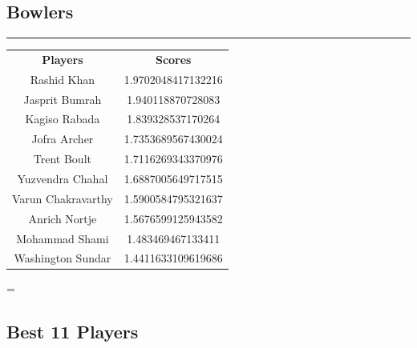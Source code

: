 \documentclass[12pt]{article}
\begin{document}
\begin{minipage}{240pt}
	\subsection*{Bowlers}
	\hrule
	\begin{tabular}{c | c}
		\textbf{Players} & \textbf{Scores}\\
		Rashid Khan & 1.9702048417132216 \\
		Jasprit Bumrah & 1.940118870728083 \\
		Kagiso Rabada & 1.839328537170264 \\
		Jofra Archer & 1.7353689567430024 \\
		Trent Boult & 1.7116269343370976 \\
		Yuzvendra Chahal & 1.6887005649717515 \\
		Varun Chakravarthy & 1.5900584795321637 \\
		Anrich Nortje & 1.5676599125943582 \\
		Mohammad Shami & 1.483469467133411 \\
		Washington Sundar & 1.4411633109619686 \\
	\end{tabular}=\\
\end{minipage}


\subsection*{Best 11 Players}
\end{document}
